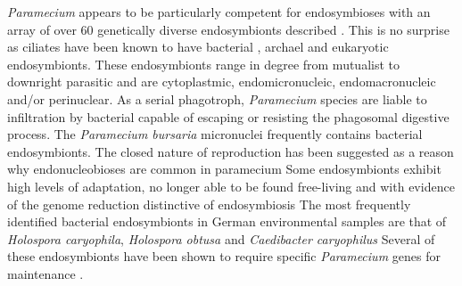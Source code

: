 \textit{Paramecium} appears to be particularly competent for endosymbioses with an array of over 60 
genetically diverse endosymbionts described \citep{Gortz2009}. 
This is no surprise as ciliates have been known to have bacterial \citep{Gortz2009}, archael \citep{Wrede2012} and 
eukaryotic \citep{Kodama2009a} endosymbionts.
These endosymbionts range in degree from mutualist to downright parasitic and are cytoplastmic, endomicronucleic,
endomacronucleic and/or perinuclear. 
As a serial phagotroph, \textit{Paramecium} species are liable to infiltration by bacterial capable of escaping or resisting
the phagosomal digestive process. %
The \textit{Paramecium bursaria} micronuclei frequently contains bacterial endosymbionts. The closed nature of reproduction
has been suggested as a reason why endonucleobioses are common in paramecium \citep{Gortz2009}
Some endosymbionts exhibit high levels of adaptation, no longer able to be found free-living and with evidence of the genome reduction
distinctive of endosymbiosis \citep{Gortz2009} %
The most frequently identified bacterial endosymbionts in German environmental samples are that of \textit{Holospora  caryophila},
\textit{Holospora obtusa} and \textit{Caedibacter caryophilus}
Several of these endosymbionts have been shown to require specific \textit{Paramecium} genes for maintenance \cite{Fujishima1985}.


%

%




